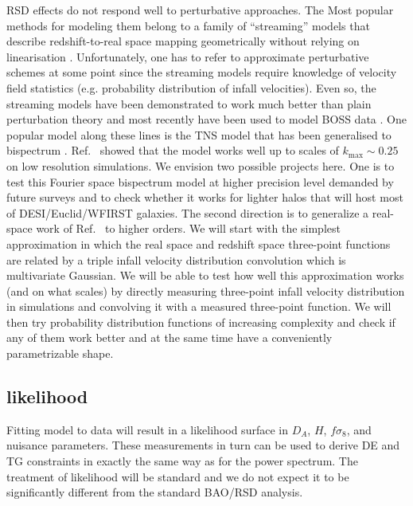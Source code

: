 RSD effects do not respond well to perturbative approaches. The Most popular
methods for modeling them belong to a family of ``streaming'' models that
describe redshift-to-real space mapping geometrically without relying on
linearisation \cite{1995ApJ...448..494F,2018MNRAS.479.2256K,2016PhRvD..94l3522K,2016JCAP...12..007V,2015PhRvD..92f3004U}. Unfortunately, one has to refer to approximate
perturbative schemes at some point since the streaming models require knowledge
of velocity field statistics (e.g. probability distribution of infall
velocities). Even so, the streaming models have been demonstrated to work much
better than plain perturbation theory and most recently have been used to model
BOSS data \cite{2012MNRAS.426.2719R}. One popular model along these lines is
the TNS model \cite{2010PhRvD..82f3522T} that has been generalised to
bispectrum \cite{2017PhRvD..96d3526H}. Ref.~\cite{2017PhRvD..96d3526H} showed
that the model works well up to scales of $k_\mathrm{max} \sim 0.25$ on low
resolution simulations. We envision two possible projects here. One is to test
this Fourier space bispectrum model at higher precision level demanded by
future surveys and to check whether it works for lighter halos that will host
most of DESI/Euclid/WFIRST galaxies. The second direction is to generalize a
real-space work of Ref.~\cite{2018MNRAS.479.2256K} to higher orders. We will
start with the simplest approximation in which the real space and redshift
space three-point functions are related by a triple infall velocity
distribution convolution which is multivariate Gaussian. We will be able to
test how well this approximation works (and on what scales) by directly
measuring three-point infall velocity distribution in simulations and
convolving it with a measured three-point function. We will then try
probability distribution functions of increasing complexity and check if any of
them work better and at the same time have a conveniently parametrizable shape.

\subsection*{likelihood}

Fitting model to data will result in a likelihood surface in $D_A$, $H$,
$f\sigma_8$, and nuisance parameters. These measurements in turn can be used to
derive DE and TG constraints in exactly the same way as for the power spectrum.
The treatment of likelihood will be standard and we do not expect it to be
significantly different from the standard BAO/RSD analysis. 


